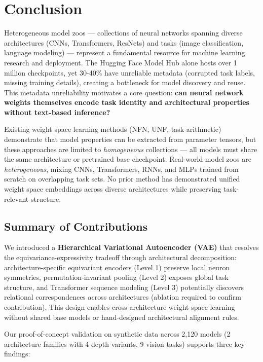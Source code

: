 \section{Conclusion}

Heterogeneous model zoos --- collections of neural networks spanning diverse architectures (CNNs, Transformers, ResNets) and tasks (image classification, language modeling) --- represent a fundamental resource for machine learning research and deployment. The Hugging Face Model Hub alone hosts over 1 million checkpoints, yet 30-40\% have unreliable metadata (corrupted task labels, missing training details), creating a bottleneck for model discovery and reuse. This metadata unreliability motivates a core question: \textbf{can neural network weights themselves encode task identity and architectural properties without text-based inference?}

Existing weight space learning methods (NFN, UNF, task arithmetic) demonstrate that model properties can be extracted from parameter tensors, but these approaches are limited to \textit{homogeneous} collections --- all models must share the same architecture or pretrained base checkpoint. Real-world model zoos are \textit{heterogeneous}, mixing CNNs, Transformers, RNNs, and MLPs trained from scratch on overlapping task sets. No prior method has demonstrated unified weight space embeddings across diverse architectures while preserving task-relevant structure.

\subsection{Summary of Contributions}

We introduced a \textbf{Hierarchical Variational Autoencoder (VAE)} that resolves the equivariance-expressivity tradeoff through architectural decomposition: architecture-specific equivariant encoders (Level 1) preserve local neuron symmetries, permutation-invariant pooling (Level 2) exposes global task structure, and Transformer sequence modeling (Level 3) potentially discovers relational correspondences across architectures (ablation required to confirm contribution). This design enables cross-architecture weight space learning without shared base models or hand-designed architectural alignment rules.

Our proof-of-concept validation on synthetic data across 2,120 models (2 architecture families with 4 depth variants, 9 vision tasks) supports three key findings:

